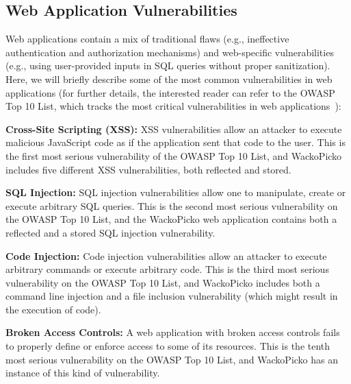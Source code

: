 \subsection{Web Application Vulnerabilities}

Web applications contain a mix of traditional flaws (e.g.,
ineffective authentication and authorization mechanisms) and web-specific
vulnerabilities (e.g., using user-provided inputs in SQL queries 
without proper sanitization). Here, we will briefly describe some of the
most common vulnerabilities in web applications (for further details,
the interested reader can refer to the OWASP Top 10 List,
which tracks the most critical vulnerabilities in web
applications~\cite{owasptopten}):
\begin{compactitem}
\item {\bf Cross-Site Scripting (XSS): }
XSS vulnerabilities allow an attacker to execute malicious JavaScript
code as if the application sent that code to the user. 
This is the first most serious vulnerability of the OWASP Top 10 List,
and WackoPicko includes five different XSS vulnerabilities, both
reflected and stored.

\item {\bf SQL Injection: }
SQL injection vulnerabilities allow one to manipulate, create or execute
arbitrary SQL queries.
This is the second most serious vulnerability on the OWASP Top 10 List, and
the WackoPicko web application contains both a reflected and a stored SQL injection
vulnerability.

\item {\bf Code Injection: }
Code injection vulnerabilities allow an attacker to execute arbitrary
commands or execute arbitrary code.
This is the third most serious vulnerability on the OWASP Top 10 List, and
WackoPicko includes both a command line injection and a file inclusion
vulnerability (which might result in the execution of code).

\item {\bf Broken Access Controls: }
A web application with broken access controls fails to properly define
or enforce access to some of its resources.
This is the tenth most serious vulnerability on the OWASP Top 10
List, and
WackoPicko has an instance of this kind of vulnerability.

\end{compactitem}

